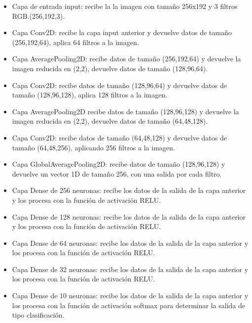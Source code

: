 \documentclass[colorinlistoftodos,twoside,twocolumn,10pt]{article} %
\begin{document}
\begin{itemize}
	\item Capa de entrada input: recibe la la imagen con tama\~no 256x192 y 3 filtros RGB.(256,192,3).

\item Capa Conv2D: recibe la capa input anterior y devuelve datos de tama\~no (256,192,64), aplica 64 filtros a la imagen.

\item Capa AveragePooling2D: recibe datos de tama\~no (256,192,64) y devuelve la imagen reducida en (2,2), devuelve datos de tama\~no (128,96,64).

\item Capa Conv2D: recibe datos de tama\~no (128,96,64) y devuelve datos de tama\~no (128,96,128), aplica 128 filtros a la imagen.

\item Capa AveragePooling2D recibe datos de tama\~no (128,96,128) y devuelve la imagen reducida en (2,2), devuelve datos de tama\~no (64,48,128).

\item Capa Conv2D: recibe datos de tama\~no (64,48,128) y devuelve datos de tama\~no (64,48,256), aplicando 256 filtros a la imagen.

\item Capa GlobalAveragePooling2D: recibe datos de tama\~no (128,96,128) y devuelve un vector 1D \cite{Machine Learning and Deep Learning methods for music genre Classification} de tama\~no 256, con una salida por cada filtro.

\item Capa Dense de 256 neuronas: recibe los datos de la salida de la capa anterior y los procesa con la funci\'on de activaci\'on RELU.

\item Capa Dense de 128 neuronas: recibe los datos de la salida de la capa anterior y los procesa con la funci\'on de activaci\'on RELU.

\item Capa Dense de 64 neuronas: recibe los datos de la salida de la capa anterior y los procesa con la funci\'on de activaci\'on RELU.

\item Capa Dense de 32 neuronas: recibe los datos de la salida de la capa anterior y los procesa con la funci\'on de activaci\'on RELU.

\item Capa Dense de 10 neuronas: recibe los datos de la salida de la capa anterior y los procesa con la funci\'on de activaci\'on softmax para determinar la salida de tipo clasificaci\'on.
\end{itemize}
\end{document}
